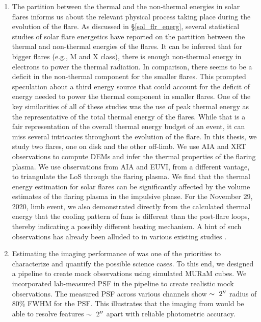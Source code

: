 \begin{enumerate}

    \item The partition between the thermal and the non-thermal energies in solar flares informs us about the relevant physical process taking place during the evolution of the flare. As discussed in \S\ref{sol_flr_energ}, several statistical studies of solar flare energetics \cite[e.g.,][]{warmuth16a, warmuth16b, stosire07, emslie12, inglis14, ash17} have reported on the partition between the thermal and non-thermal energies of the flares. It can be inferred that for bigger flares (e.g., M and X class), there is enough non-thermal energy in electrons to power the thermal radiation. In comparison, there seems to be a deficit in the non-thermal component for the smaller flares. This prompted speculation about a third energy source that could account for the deficit of energy needed to power the thermal component in smaller flares. One of the key similarities of all of these studies was the use of peak thermal energy as the representative of the total thermal energy of the flares. While that is a fair representation of the overall thermal energy budget of an event, it can miss several intricacies throughout the evolution of the flare. In this thesis, we study two flares, one on disk and the other off-limb. We use AIA and XRT observations to compute DEMs and infer the thermal properties of the flaring plasma. We use observations from AIA and EUVI, from a different vantage,  to triangulate the LoS through the flaring plasma. We find that the thermal energy estimation for solar flares can be significantly affected by the volume estimates of the flaring plasma in the impulsive phase. For the November 29, 2020, limb event, we also demonstrated directly from the calculated thermal energy that the cooling pattern of fans is different than the post-flare loops, thereby indicating a possibly different heating mechanism. A hint of such observations has already been alluded to in various existing studies \citep[e.g.,][]{xie23,reeves19,longcope11}. 

    \item Estimating the imaging performance of {\suit} was one of the priorities to characterize and quantify the possible science cases. To this end, we designed a pipeline to create mock {\suit} observations using simulated MURaM cubes. We incorporated lab-measured PSF in the pipeline to create realistic mock observations.  The measured PSF across various channels show $\sim~2\hbox{$^{\prime\prime}$}$ radius of 80\% FWHM for the PSF. This illustrates that the imaging from {\suit} would be able to resolve features $\sim~2\hbox{$^{\prime\prime}$}$ apart with reliable photometric accuracy. 


\end{enumerate}
